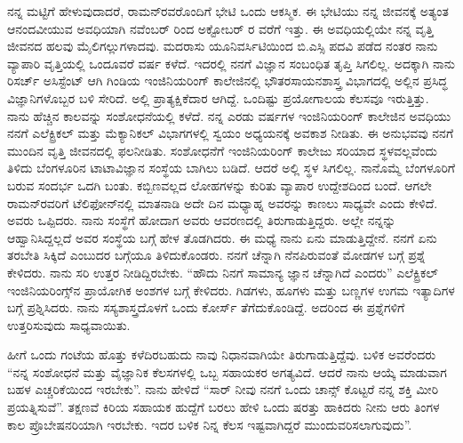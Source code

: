 \vskip 2pt

ನನ್ನ ಮಟ್ಟಿಗೆ ಹೇಳುವುದಾದರೆ, ರಾಮನ್‍ರವರೊಂದಿಗೆ ಭೇಟಿ ಒಂದು ಆಕಸ್ಮಿಕ. ಈ ಭೇಟಿಯು ನನ್ನ ಜೀವನಕ್ಕೆ ಅತ್ಯಂತ ಆನಂದವೀಯುವ ಅವಧಿಯಾಗಿ ನವೆಂಬರ್ ರಿಂದ ಅಕ್ಟೋಬರ್ ರ ವರೆಗೆ ಇತ್ತು. ಈ ಅವಧಿಯಲ್ಲಿಯೇ ನನ್ನ ವೃತ್ತಿ ಜೀವನದ ಹಲವು ಮೈಲಿಗಲ್ಲುಗಳಾದವು. ಮದರಾಸು ಯೂನಿವರ್ಸಿಟಿಯಿಂದ ಬಿ.ಎಸ್ಸಿ ಪದವಿ ಪಡೆದ ನಂತರ ನಾನು ವ್ಯಾಪಾರಿ ವೃತ್ತಿಯಲ್ಲಿ ಒಂದೂವರೆ ವರ್ಷ ಕಳೆದೆ. ಇದರಲ್ಲಿ ನನಗೆ ವಿಜ್ಞಾನ ಸಂಬಂಧಿತ ತೃಪ್ತಿ ಸಿಗಲಿಲ್ಲ. ಅದಕ್ಕಾಗಿ ನಾನು ರಿಸರ್ಚ್ ಅಸಿಸ್ಟೆಂಟ್ ಆಗಿ ಗಿಂಡಿಯ ಇಂಜಿನಿಯರಿಂಗ್ ಕಾಲೇಜಿನಲ್ಲಿ ಭೌತರಸಾಯನಶಾಸ್ತ್ರ ವಿಭಾಗದಲ್ಲಿ ಅಲ್ಲಿನ ಪ್ರಸಿದ್ಧ ವಿಜ್ಞಾನಿಗಳೊಬ್ಬರ ಬಳಿ ಸೇರಿದೆ. ಅಲ್ಲಿ ಪ್ರಾತ್ಯಕ್ಷಿಕೆದಾರ ಆಗಿದ್ದೆ. ಒಂದಿಷ್ಟು ಪ್ರಯೋಗಾಲಯ ಕೆಲಸವೂ ಇರುತ್ತಿತ್ತು. ನಾನು ಹೆಚ್ಚಿನ ಕಾಲವನ್ನು ಸಂಶೋಧನೆಯಲ್ಲಿ ಕಳೆದೆ. ನನ್ನ ಎರಡು ವರ್ಷಗಳ ಇಂಜಿನಿಯರಿಂಗ್ ಕಾಲೇಜಿನ ಅವಧಿಯು ನನಗೆ ಎಲೆಕ್ಟ್ರಿಕಲ್ ಮತ್ತು ಮೆಕ್ಯಾನಿಕಲ್ ವಿಭಾಗಗಳಲ್ಲಿ ಸ್ವಯಂ ಅಧ್ಯಯನಕ್ಕೆ ಅವಕಾಶ ನೀಡಿತು. ಈ ಅನುಭವವು ನನಗೆ ಮುಂದಿನ ವೃತ್ತಿ ಜೀವನದಲ್ಲಿ ಫಲನೀಡಿತು. ಸಂಶೋಧನೆಗೆ ಇಂಜಿನಿಯರಿಂಗ್ ಕಾಲೇಜು ಸರಿಯಾದ ಸ್ಥಳವಲ್ಲವೆಂದು ತಿಳಿದು ಬೆಂಗಳೂರಿನ ಟಾಟಾವಿಜ್ಞಾನ ಸಂಸ್ಥೆಯ ಬಾಗಿಲು ಬಡಿದೆ. ಆದರೆ ಅಲ್ಲಿ ಸ್ಥಳ ಸಿಗಲಿಲ್ಲ. ನಾನೊಮ್ಮೆ ಬೆಂಗಳೂರಿಗೆ ಬರುವ ಸಂದರ್ಭ ಒದಗಿ ಬಂತು. ಕಬ್ಬಿಣವಲ್ಲದ ಲೋಹಗಳನ್ನು ಕುರಿತು ವ್ಯಾಪಾರ ಉದ್ದೇಶದಿಂದ ಬಂದೆ. ಆಗಲೇ ರಾಮನ್‍ರವರಿಗೆ ಟೆಲಿಫೋನ್‍ನಲ್ಲಿ ಮಾತನಾಡಿ ಅದೇ ದಿನ ಮಧ್ಯಾಹ್ನ ಅವರನ್ನು ಕಾಣಲು ಸಾಧ್ಯವೇ ಎಂದು ಕೇಳಿದೆ. ಅವರು ಒಪ್ಪಿದರು. ನಾನು ಸಂಸ್ಥೆಗೆ ಹೋದಾಗ ಅವರು ಆವರಣದಲ್ಲಿ ತಿರುಗಾಡುತ್ತಿದ್ದರು. ಅಲ್ಲೇ ನನ್ನನ್ನು ಆಹ್ವಾನಿಸಿದ್ದಲ್ಲದೆ ಅವರ ಸಂಸ್ಥೆಯ ಬಗ್ಗೆ ಹೇಳ ತೊಡಗಿದರು. ಈ ಮಧ್ಯೆ ನಾನು ಏನು ಮಾಡುತ್ತಿದ್ದೇನೆ. ನನಗೆ ಏನು ತರಬೇತಿ ಸಿಕ್ಕಿದೆ ಎಂಬುದರ ಬಗ್ಗೆಯೂ ತಿಳಿದುಕೊಂಡರು. ನನಗೆ ಚೆನ್ನಾಗಿ ನೆನಪಿರುವಂತೆ ಮೋಡಗಳ ಬಗ್ಗೆ ಪ್ರಶ್ನೆ ಕೇಳಿದರು. ನಾನು ಸರಿ ಉತ್ತರ ನೀಡಿದ್ದಿರಬೇಕು. “ಹೌದು ನಿನಗೆ ಸಾಮಾನ್ಯ ಜ್ಞಾನ ಚೆನ್ನಾಗಿದೆ ಎಂದರು” ಎಲೆಕ್ಟ್ರಿಕಲ್ ಇಂಜಿನಿಯರಿಂಗ್ಸ್‌ನ ಪ್ರಾಯೋಗಿಕ ಅಂಶಗಳ ಬಗ್ಗೆ ಕೇಳಿದರು. ಗಿಡಗಳು, ಹೂಗಳು ಮತ್ತು ಬಣ್ಣಗಳ ಉಗಮ ಇತ್ಯಾದಿಗಳ ಬಗ್ಗೆ ಪ್ರಶ್ನಿಸಿದರು. ನಾನು ಸಸ್ಯಶಾಸ್ತ್ರದೊಳಗೆ ಒಂದು ಕೋರ್ಸ್ ತೆಗೆದುಕೊಂಡಿದ್ದೆ. ಅದರಿಂದ ಈ ಪ್ರಶ್ನೆಗಳಿಗೆ ಉತ್ತರಿಸುವುದು ಸಾಧ್ಯವಾಯಿತು.

ಹೀಗೆ ಒಂದು ಗಂಟೆಯ ಹೊತ್ತು ಕಳೆದಿರಬಹುದು ನಾವು ನಿಧಾನವಾಗಿಯೇ ತಿರುಗಾಡುತ್ತಿದ್ದೆವು. ಬಳಿಕ ಅವರೆಂದರು \enginline{-} “ನನ್ನ ಸಂಶೋಧನೆ ಮತ್ತು ವೈಜ್ಞಾನಿಕ ಕೆಲಸಗಳಲ್ಲಿ ಒಬ್ಬ ಸಹಾಯಕರ ಅಗತ್ಯವಿದೆ. ಆದರೆ ನಾನು ಆಯ್ಕೆ ಮಾಡುವಾಗ ಬಹಳ ಎಚ್ಚರಿಕೆಯಿಂದ ಇರಬೇಕು”. ನಾನು ಹೇಳಿದೆ “ಸಾರ್ ನೀವು ನನಗೆ ಒಂದು ಚಾನ್ಸ್ ಕೊಟ್ಟರೆ ನನ್ನ ಶಕ್ತಿ ಮೀರಿ ಪ್ರಯತ್ನಿಸುವೆ”. ತಕ್ಷಣವೆ ಕಿರಿಯ ಸಹಾಯಕ ಹುದ್ದೆಗೆ ಬರಲು ಹೇಳಿ ಒಂದು ಷರತ್ತು ಹಾಕಿದರು \enginline{-} ನೀನು ಆರು ತಿಂಗಳ ಕಾಲ ಪ್ರೊಬೇಷನರಿಯಾಗಿ ಇರಬೇಕು. ಇದರ ಬಳಿಕ ನಿನ್ನ ಕೆಲಸ ಇಷ್ಟವಾಗಿದ್ದರೆ ಮುಂದುವರಿಸಲಾಗುವುದು”.

